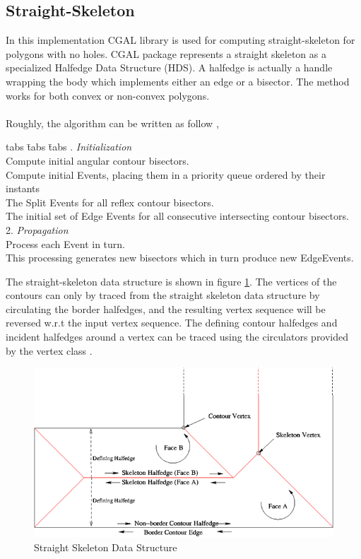\documentclass[11pt]{article}
\begin{document}
\subsection{Straight-Skeleton }
In this implementation CGAL library is used for computing straight-skeleton for polygons with no holes. CGAL package represents a straight skeleton as a specialized Halfedge Data Structure (HDS). A halfedge is actually a handle wrapping the body which implements either an edge or a bisector. The method works for both convex or non-convex polygons.\\\\
Roughly, the algorithm can be written as follow \cite{cacciola},
\begin{tabbing}
tabs \= tabs \= tabs  . \emph{Initialization} \\
\> Compute initial angular contour bisectors. \\
\>Compute initial Events, placing them in a priority queue ordered by their instants \\
\> \> The Split Events for all reflex contour bisectors.\\
\> \> The initial set of Edge Events for all consecutive intersecting contour bisectors.\\
2. \emph{Propagation} \\ \> Process each Event in turn. \\ \>\>This processing generates new bisectors which in turn produce new EdgeEvents.
\end{tabbing}
The straight-skeleton data structure is shown in figure \ref{fig:SSstruc}. The vertices of the contours can only by traced from the straight skeleton data structure by circulating the border halfedges, and the resulting vertex sequence will be reversed w.r.t the input vertex sequence. The defining contour halfedges and incident halfedges around a vertex can be traced using the circulators provided by the vertex class \cite{CGALss}.

\begin{figure}[H]
\centering
\includegraphics[width=.5\textwidth]{FIGS/Part1/fig6}
\caption{Straight Skeleton Data Structure}
\label{fig:SSstruc}
\end{figure}
\end{document}
